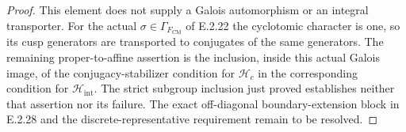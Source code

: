 \begin{proof}
This element does not supply a Galois automorphism or an
integral transporter. For the actual \(\sigma\in\Gamma_{F_{\mathrm{CM}}}\)
of E.2.22 the cyclotomic character is one, so its cusp
generators are transported to conjugates of the same
generators. The remaining proper-to-affine assertion is
the inclusion, inside this actual Galois image, of the
conjugacy-stabilizer condition for \(\mathcal H_c\) in
the corresponding condition for \(\mathcal H_{\mathrm{int}}\).
The strict subgroup inclusion just proved establishes
neither that assertion nor its failure. The exact
off-diagonal boundary-extension block in E.2.28 and the
discrete-representative requirement remain to be resolved.
\end{proof}
